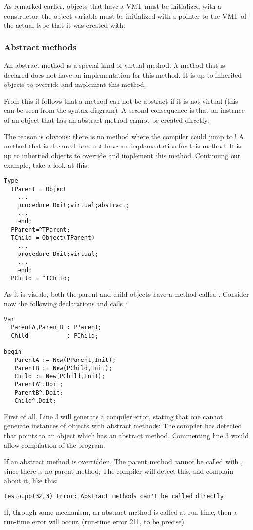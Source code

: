 As remarked earlier, objects that have a VMT must be initialized with a
constructor: the object variable must be initialized with a pointer to
the VMT of the actual type that it was created with.

%
\subsubsection{Abstract methods}
An abstract method is a special kind of virtual method. A method that is
declared  does not have an implementation for this method. 
It is up to inherited objects to override and implement this method.

From this it follows that a method can not be abstract if it is not virtual 
(this can be seen from the syntax diagram). A second consequence is that 
an instance of an object that has an abstract method cannot be created
directly.

The reason is obvious: there is no method where the compiler could jump to !
A method that is declared  does not have an implementation for
this method. It is up to inherited objects to override and implement this
method. Continuing our example, take a look at this:
\begin{verbatim}
Type
  TParent = Object
    ...
    procedure Doit;virtual;abstract;
    ...
    end;
  PParent=^TParent;
  TChild = Object(TParent)
    ...
    procedure Doit;virtual;
    ...
    end;
  PChild = ^TChild;
\end{verbatim}
As it is visible, both the parent and child objects have a method called
. Consider now the following declarations and calls :
\begin{verbatim}
Var 
  ParentA,ParentB : PParent;
  Child           : PChild;

begin
   ParentA := New(PParent,Init);
   ParentB := New(PChild,Init);
   Child := New(PChild,Init);
   ParentA^.Doit;
   ParentB^.Doit;
   Child^.Doit;
\end{verbatim}
First of all, Line 3 will generate a compiler error, stating that one cannot
generate instances of objects with abstract methods: The compiler has
detected that  points to an object which has an abstract
method. Commenting line 3 would allow compilation of the program.
\begin{remark}
If an abstract method is overridden, The parent method cannot be called
with , since there is no parent method; The compiler
will detect this, and complain about it, like this:
\begin{verbatim}
testo.pp(32,3) Error: Abstract methods can't be called directly
\end{verbatim}
If, through some mechanism, an abstract method is called at run-time,
then a run-time error will occur. (run-time error 211, to be precise)
\end{remark}

